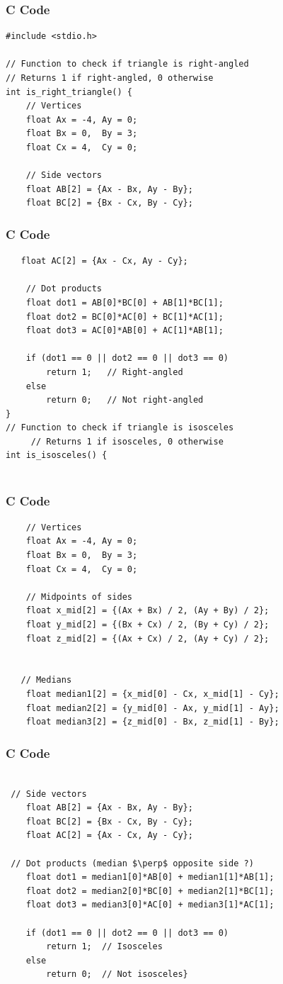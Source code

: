 \documentclass{beamer}
\begin{document}
\begin{frame}[fragile]
    \frametitle{C Code }
\begin{lstlisting}
#include <stdio.h>

// Function to check if triangle is right-angled
// Returns 1 if right-angled, 0 otherwise
int is_right_triangle() {
    // Vertices
    float Ax = -4, Ay = 0;
    float Bx = 0,  By = 3;
    float Cx = 4,  Cy = 0;

    // Side vectors
    float AB[2] = {Ax - Bx, Ay - By};
    float BC[2] = {Bx - Cx, By - Cy};

\end{lstlisting}
\end{frame}

\begin{frame}[fragile]
    \frametitle{C Code }
\begin{lstlisting}
   float AC[2] = {Ax - Cx, Ay - Cy};

    // Dot products
    float dot1 = AB[0]*BC[0] + AB[1]*BC[1];
    float dot2 = BC[0]*AC[0] + BC[1]*AC[1];
    float dot3 = AC[0]*AB[0] + AC[1]*AB[1];

    if (dot1 == 0 || dot2 == 0 || dot3 == 0)
        return 1;   // Right-angled
    else
        return 0;   // Not right-angled
}
// Function to check if triangle is isosceles
     // Returns 1 if isosceles, 0 otherwise
int is_isosceles() {
   

\end{lstlisting}
\end{frame}

\begin{frame}[fragile]
    \frametitle{C Code }
\begin{lstlisting}
    // Vertices
    float Ax = -4, Ay = 0;
    float Bx = 0,  By = 3;
    float Cx = 4,  Cy = 0;
    
    // Midpoints of sides
    float x_mid[2] = {(Ax + Bx) / 2, (Ay + By) / 2};
    float y_mid[2] = {(Bx + Cx) / 2, (By + Cy) / 2};
    float z_mid[2] = {(Ax + Cx) / 2, (Ay + Cy) / 2};

    
   // Medians
    float median1[2] = {x_mid[0] - Cx, x_mid[1] - Cy};
    float median2[2] = {y_mid[0] - Ax, y_mid[1] - Ay};
    float median3[2] = {z_mid[0] - Bx, z_mid[1] - By};
\end{lstlisting}
\end{frame}

\begin{frame}[fragile]
    \frametitle{C Code }
\begin{lstlisting}

 // Side vectors
    float AB[2] = {Ax - Bx, Ay - By};
    float BC[2] = {Bx - Cx, By - Cy};
    float AC[2] = {Ax - Cx, Ay - Cy};

 // Dot products (median $\perp$ opposite side ?)
    float dot1 = median1[0]*AB[0] + median1[1]*AB[1];
    float dot2 = median2[0]*BC[0] + median2[1]*BC[1];
    float dot3 = median3[0]*AC[0] + median3[1]*AC[1];

    if (dot1 == 0 || dot2 == 0 || dot3 == 0)
        return 1;  // Isosceles
    else
        return 0;  // Not isosceles}
\end{lstlisting}
\end{frame}
\end{document}
